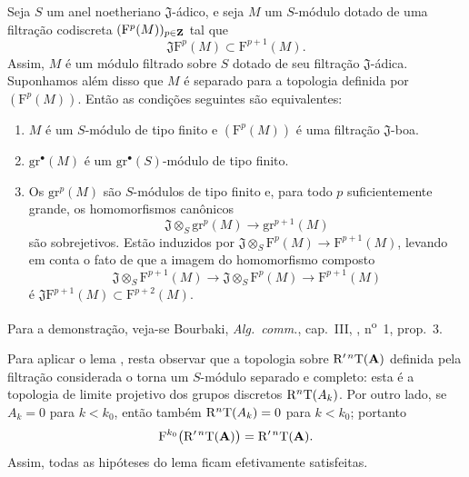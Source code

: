 \begin{lemma}[13.7.7.2]
\label{0.13.7.7.2}
Seja $S$ um anel noetheriano $\mathfrak{J}$-ádico, e seja $M$
um $S$-módulo dotado de uma filtração codiscreta
$(\mathrm{F}^p(M))_{p\in\mathbf{Z}}$ tal que
\[
  \mathfrak{J}\mathrm{F}^p(M)
  \subset
  \mathrm{F}^{p+1}(M).
\]
Assim, $M$ é um módulo filtrado sobre $S$ dotado de seu
filtração $\mathfrak{J}$-ádica.
Suponhamos além disso que $M$ é separado para a topologia definida por
$(\mathrm{F}^p(M))$.
Então as condições seguintes são equivalentes:
\begin{enumerate}
  \item[{\rm a)}] $M$ é um $S$-módulo de tipo finito e
  $(\mathrm{F}^p(M))$ é uma filtração $\mathfrak{J}$-boa.
  \item[{\rm b)}] $\mathrm{gr}^\bullet(M)$ é um
  $\mathrm{gr}^\bullet(S)$-módulo de tipo finito.
  \item[{\rm c)}] Os $\mathrm{gr}^p(M)$ são $S$-módulos de
  tipo finito e, para todo $p$ suficientemente grande, os homomorfismos
  canônicos
  \begin{equation}
  \label{0.13.7.7.3}
  \tag{13.7.7.3}
    \mathfrak{J}\otimes_S\mathrm{gr}^p(M)
    \longrightarrow
    \mathrm{gr}^{p+1}(M)
  \end{equation}
  são sobrejetivos.
  Estão induzidos por
  $\mathfrak{J}\otimes_S\mathrm{F}^p(M)
  \longrightarrow\mathrm{F}^{p+1}(M)$, levando em conta o fato
  de que a imagem do homomorfismo composto
  \[
    \mathfrak{J}\otimes_S\mathrm{F}^{p+1}(M)
    \longrightarrow
    \mathfrak{J}\otimes_S\mathrm{F}^p(M)
    \longrightarrow
    \mathrm{F}^{p+1}(M)
  \]
  é
  $\mathfrak{J}\mathrm{F}^{p+1}(M)
  \subset\mathrm{F}^{p+2}(M)$.
\end{enumerate}

Para a demonstração, veja-se Bourbaki, \emph{Alg.\ comm.}, cap.~III,
, n\textsuperscript{o}~1, prop.~3.
\end{lemma}

\begin{env}[13.7.7.4]
\label{0.13.7.7.4}
Para aplicar o lema , resta observar que a
topologia sobre $\mathrm{R}'^{\,n}\mathrm{T}(\mathbf{A})$ definida pela filtração
considerada o torna um $S$-módulo separado e completo:
esta é a topologia de limite projetivo dos grupos discretos
$\mathrm{R}^n\mathrm{T}(A_k)$.
Por outro lado, se $A_k=0$ para $k<k_0$, então também
$\mathrm{R}^n\mathrm{T}(A_k)=0$ para $k<k_0$; portanto
\[
  \mathrm{F}^{k_0}\bigl(\mathrm{R}'^{\,n}\mathrm{T}(\mathbf{A})\bigr)
  =
  \mathrm{R}'^{\,n}\mathrm{T}(\mathbf{A}).
\]
Assim, todas as hipóteses do lema ficam efetivamente satisfeitas.
\end{env}

